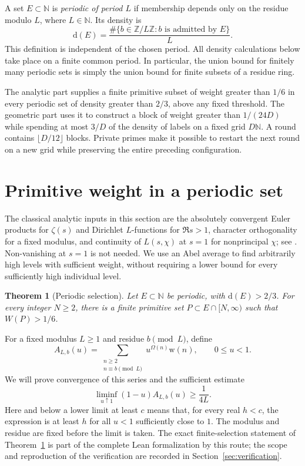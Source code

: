 \documentclass[11pt,reqno]{amsart}
\newtheorem{theorem}{Theorem}[section]
\theoremstyle{definition}
\theoremstyle{remark}
\numberwithin{equation}{section}
\newcommand{\N}{\mathbb N}
\newcommand{\Z}{\mathbb Z}
\newcommand{\Om}{\Omega}
\newcommand{\wt}{\mathrm w}
\newcommand{\dens}{\mathrm d}
\begin{document}
A set $E\subset\N$ is \emph{periodic of period $L$} if membership depends
only on the residue modulo $L$, where $L\in\N$. Its density is
\[
 \dens(E)=\frac{\#\{b\in\Z/L\Z:b\text{ is admitted by }E\}}{L}.
\]
This definition is independent of the chosen period. All density
calculations below take place on a finite common period. In particular,
the union bound for finitely many periodic sets is simply the union bound
for finite subsets of a residue ring.

The analytic part supplies a finite primitive subset of weight greater
than $1/6$ in every periodic set of density greater than $2/3$, above any
fixed threshold. The geometric part uses it to construct a block of
weight greater than $1/(24D)$ while spending at most $3/D$ of the density
of labels on a fixed grid $D\N$. A round contains $\lfloor D/12\rfloor$
blocks. Private primes make it possible to restart the next round on a
new grid while preserving the entire preceding configuration.

\section{Primitive weight in a periodic set}
\label{sec:analytic}

The classical analytic inputs in this section are the absolutely
convergent Euler products for $\zeta(s)$ and Dirichlet $L$-functions for
$\Re s>1$, character orthogonality for a fixed modulus, and continuity of
$L(s,\chi)$ at $s=1$ for nonprincipal $\chi$; see \cite{Tao2014}.
Non-vanishing at $s=1$ is not needed. We use an Abel average to find
arbitrarily high levels with sufficient weight, without requiring a
lower bound for every sufficiently high individual level.

\begin{theorem}[Periodic selection]\label{thm:selection}
Let $E\subset\N$ be periodic, with $\dens(E)>2/3$. For every integer
$N\geq2$, there is a finite primitive set
$P\subset E\cap[N,\infty)$ such that $W(P)>1/6$.
\end{theorem}

For a fixed modulus $L\geq1$ and residue $b\pmod L$, define
\begin{equation}\label{eq:abel-residue-mass}
 A_{L,b}(u)=\sum_{\substack{n\geq2\\n\equiv b\pmod L}}
                 u^{\Om(n)}\wt(n),\qquad 0\leq u<1.
\end{equation}
We will prove convergence of this series and the sufficient estimate
\begin{equation}\label{eq:residue-abel}
 \liminf_{u\uparrow1}(1-u)A_{L,b}(u)\geq\frac1{4L}.
\end{equation}
Here and below a lower limit at least $c$ means that, for every real
$h<c$, the expression is at least $h$ for all $u<1$ sufficiently close
to $1$. The modulus and residue are fixed before the limit is taken.
The exact finite-selection statement of Theorem~\ref{thm:selection}
is part of the complete Lean formalization by this route; the scope and
reproduction of the verification are recorded in Section~\ref{sec:verification}.
\end{document}
